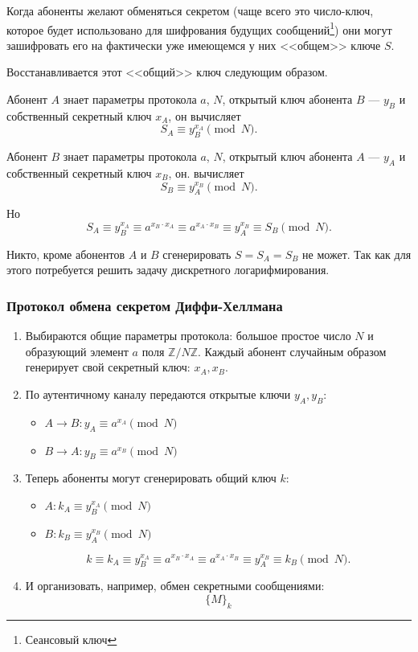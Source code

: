 Когда абоненты желают обменяться секретом (чаще всего это число-ключ, которое будет использовано для шифрования будущих сообщений\footnote{Сеансовый ключ}) они могут зашифровать его на фактически уже имеющемся у них <<общем>> ключе $S$.

Восстанавливается этот <<общий>> ключ следующим образом. 

Абонент $A$ знает параметры протокола $a$, $N$, открытый ключ абонента $B$ --- $y_B$ и собственный секретный ключ $x_A$, он вычисляет
\[S_A\equiv y_B^{x_A}\pmod{N}.\]

Абонент $B$ знает параметры протокола $a$, $N$, открытый ключ абонента $A$ --- $y_A$ и собственный секретный ключ $x_B$, он. вычисляет
\[S_B\equiv y_A^{x_B}\pmod{N}.\]

Но 
\[
S_A\equiv 
y_B^{x_A}\equiv 
a^{x_B\cdot x_A}\equiv 
a^{x_A\cdot x_B}\equiv 
y_A^{x_B}\equiv 
S_B\pmod{N}.
\]

Никто, кроме абонентов $A$ и $B$ сгенерировать $S=S_A=S_B$ не может. Так как для этого потребуется решить задачу дискретного логарифмирования.

\begin{frame}
    \frametitle{Протокол обмена секретом Диффи-Хеллмана}
    
    \begin{enumerate}
        \item Выбираются общие параметры протокола: большое простое число $N$ и образующий элемент $a$ поля $\mathbb{Z}/N\mathbb{Z}$. Каждый абонент случайным образом генерирует свой \alert{секретный} ключ: $x_A,x_B$.
        
        \item По \alert{аутентичному} каналу передаются открытые ключи $y_A,y_B$:
        \begin{itemize}
            \item $A\to B:y_A\equiv a^{x_A}\pmod{N}$
            \item $B\to A:y_B\equiv a^{x_B}\pmod{N}$
        \end{itemize}
        
        \item Теперь абоненты могут сгенерировать общий ключ $k$:
        \begin{itemize}
            \item $A:k_A\equiv y_B^{x_A}\pmod{N}$
            \item $B:k_B\equiv y_A^{x_B}\pmod{N}$
        \end{itemize}

        \[
        k\equiv k_A\equiv 
        y_B^{x_A}\equiv 
        a^{x_B\cdot x_A}\equiv 
        a^{x_A\cdot x_B}\equiv 
        y_A^{x_B}\equiv 
        k_B\pmod{N}.
        \]
        
        \item И организовать, например, обмен секретными сообщениями: \[\{M\}_k\] 
    \end{enumerate} 
\end{frame}


